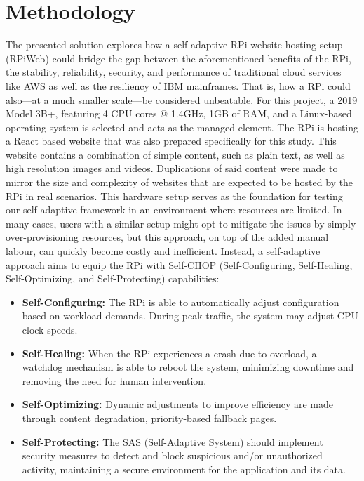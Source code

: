 \documentclass[conference]{IEEEtran}
\begin{document}
\section{\textbf{Methodology}}\label{methodology}
The presented solution explores how a self-adaptive RPi website hosting setup (RPiWeb) could bridge the gap between the aforementioned benefits of the RPi, the stability, reliability, security, and performance of traditional cloud services like AWS as well as the resiliency of IBM mainframes. That is, how a RPi could also—at a much smaller scale—be considered unbeatable. For this project, a 2019 Model 3B+, featuring 4 CPU cores @ 1.4GHz, 1GB of RAM, and a Linux-based operating system is selected and acts as the managed element. The RPi is hosting a React based website that was also prepared specifically for this study. This website contains a combination of simple content, such as plain text, as well as high resolution images and videos. Duplications of said content were made to mirror the size and complexity of websites that are expected to be hosted by the RPi in real scenarios. This hardware setup serves as the foundation for testing our self-adaptive framework in an environment where resources are limited. In many cases, users with a similar setup might opt to mitigate the issues by simply over-provisioning resources, but this approach, on top of the added manual labour, can quickly become costly and inefficient. Instead, a self-adaptive approach aims to equip the RPi with Self-CHOP (Self-Configuring, Self-Healing, Self-Optimizing, and Self-Protecting) capabilities:

\begin{itemize}
    \item \textbf{Self-Configuring:}
          The RPi is able to automatically adjust configuration based on workload demands. During peak traffic, the system may adjust CPU clock speeds.
    \item \textbf{Self-Healing:}
          When the RPi experiences a crash due to overload, a watchdog mechanism is able to reboot the system, minimizing downtime and removing the need for human intervention.
    \item \textbf{Self-Optimizing:}
          Dynamic adjustments to improve efficiency are made through content degradation, priority-based fallback pages.
    \item \textbf{Self-Protecting:}
          The SAS (Self-Adaptive System) should implement security measures to detect and block suspicious and/or unauthorized activity, maintaining a secure environment for the application and its data.
\end{itemize}
\end{document}
